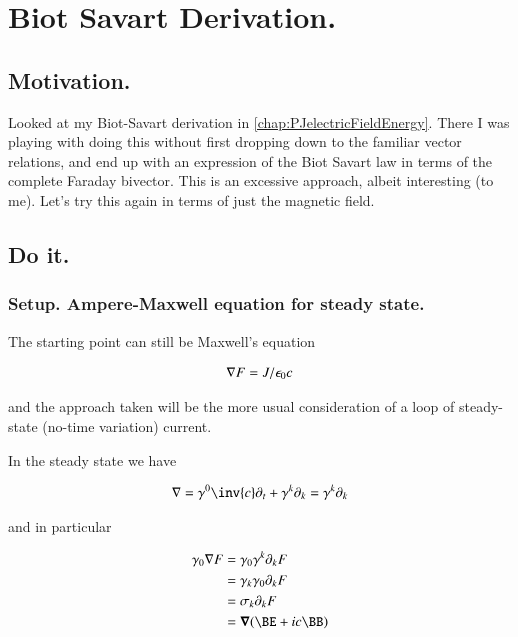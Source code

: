 \chapter{Biot Savart Derivation.}
\date{ April 18, 2009.  $RCSfile: biotSavart.tex,v $ Last $Revision: 1.8 $ $Date: 2009/06/11 16:45:58 $ }

\section{Motivation. }

Looked at my Biot-Savart derivation in \ref{chap:PJelectricFieldEnergy}.  There I was playing with doing this without first dropping down to the
familiar vector relations, and end up with an expression of the Biot Savart law in terms of the complete Faraday bivector.  This is
an excessive approach, albeit interesting (to me).  Let's try this again in terms of just the magnetic field.

\section{Do it. }

\subsection{Setup. Ampere-Maxwell equation for steady state. }

The starting point can still be Maxwell's equation

\begin{align}
\nabla F = J/\epsilon_0 c
\end{align}

and the approach taken will be the more usual consideration of a loop of steady-state (no-time variation) current.

In the steady state we have

\begin{align*}
\grad = \gamma^0 \inv{c} \partial_t + \gamma^k \partial_k = \gamma^k \partial_k
\end{align*}

and in particular

\begin{align*}
\gamma_0 \grad F
&= \gamma_0 \gamma^k \partial_k F \\
&= \gamma_k \gamma_0 \partial_k F \\
&= \sigma_k \partial_k F \\
&= \spacegrad (\BE + i c \BB) \\
\end{align*}

